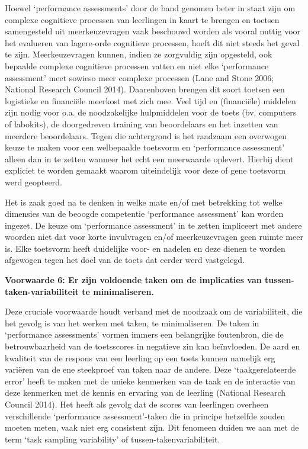 \documentclass[
  letterpaper,
]{report}
\begin{document}
Hoewel `performance assessments' door de band genomen beter in staat
zijn om complexe cognitieve processen van leerlingen in kaart te brengen
en toetsen samengesteld uit meerkeuzevragen vaak beschouwd worden als
vooral nuttig voor het evalueren van lagere-orde cognitieve processen,
hoeft dit niet steeds het geval te zijn. Meerkeuzevragen kunnen, indien
ze zorgvuldig zijn opgesteld, ook bepaalde complexe cognitieve processen
vatten en niet elke `performance assessment' meet sowieso meer complexe
processen (Lane and Stone 2006; National Research Council 2014).
Daarenboven brengen dit soort toetsen een logistieke en financiële
meerkost met zich mee. Veel tijd en (financiële) middelen zijn nodig
voor o.a. de noodzakelijke hulpmiddelen voor de toets (bv. computers of
labokits), de doorgedreven training van beoordelaars en het inzetten van
meerdere beoordelaars. Tegen die achtergrond is het raadzaam een
overwogen keuze te maken voor een welbepaalde toetsvorm en `performance
assessment' alleen dan in te zetten wanneer het echt een meerwaarde
oplevert. Hierbij dient expliciet te worden gemaakt waarom uiteindelijk
voor deze of gene toetsvorm werd geopteerd.

Het is zaak goed na te denken in welke mate en/of met betrekking tot
welke dimensies van de beoogde competentie `performance assessment' kan
worden ingezet. De keuze om `performance assessment' in te zetten
impliceert met andere woorden niet dat voor korte invulvragen en/of
meerkeuzevragen geen ruimte meer is. Elke toetsvorm heeft duidelijke
voor- en nadelen en deze dienen te worden afgewogen tegen het doel van
de toets dat eerder werd vastgelegd.

\textbf{Voorwaarde 6: Er zijn voldoende taken om de implicaties van
tussen-taken-variabiliteit te minimaliseren.}

Deze cruciale voorwaarde houdt verband met de noodzaak om de
variabiliteit, die het gevolg is van het werken met taken, te
minimaliseren. De taken in `performance assessments' vormen immers een
belangrijke foutenbron, die de betrouwbaarheid van de toetsscores in
negatieve zin kan beïnvloeden. De aard en kwaliteit van de respons van
een leerling op een toets kunnen namelijk erg variëren van de ene
steekproef van taken naar de andere. Deze `taakgerelateerde error' heeft
te maken met de unieke kenmerken van de taak en de interactie van deze
kenmerken met de kennis en ervaring van de leerling (National Research
Council 2014). Het heeft als gevolg dat de scores van leerlingen
overheen verschillende `performance assessment'-taken die in principe
hetzelfde zouden moeten meten, vaak niet erg consistent zijn. Dit
fenomeen duiden we aan met de term `task sampling variability' of
tussen-takenvariabiliteit.
\end{document}
